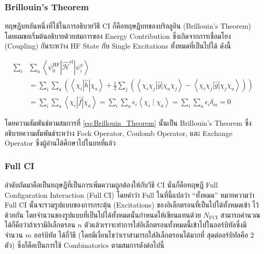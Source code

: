 \subsubsection{Brillouin's Theorem}

ทฤษฎีบทอันหนึ่งที่ใช้ในการอธิบายวิธี CI ก็คือทฤษฎีบทของบริลลูอิน (Brillouin's Theorem) โดยผมขอเริ่มต้นอธิบายด้วยสมการของ Energy
Contribution ซึ่งเกิดจากการเชื่อมโยง (Coupling) กันระหว่าง HF State กับ Single Excitations ทั้งหมดที่เป็นไปได้ ดังนี้

\begin{equation}
    \label{eq:Brillouin_Theorem}
    \begin{aligned}
        \sum_i & \sum_a
        \left\langle\psi_0^{\mathrm{HF}}
        \left| \hat{\mathscr{H}}^{\mathrm{el}} \right|
        \psi_i^a\right\rangle                                                         \\
               & = \sum_i \sum_a\left(\left\langle\chi_i|\hat{h}| \chi_a\right\rangle
        + \frac{1}{2} \sum_j\left(\left\langle\chi_i \chi_j|\hat{g}| \chi_a \chi_j\right\rangle
        - \left\langle\chi_i \chi_j|\hat{g}| \chi_j \chi_a\right\rangle\right)\right) \\
               & = \sum_i \sum_a\left\langle\chi_i|\hat{f}| \chi_a\right\rangle
        = \sum_i \sum_a \epsilon_i\left\langle\chi_i \mid \chi_a\right\rangle
        = \sum_i \sum_a \epsilon_i \delta_{i a}
        = 0
    \end{aligned}
\end{equation}

\noindent โดยความสัมพันธ์ตามสมการที่ \eqref{eq:Brillouin_Theorem} นั้นเป็น Brillouin's Theorem ซึ่งอธิบายความสัมพันธ์ระหว่าง
Fock Operator, Coulomb Operator, และ Exchange Operator ซึ่งผู้อ่านได้ศึกษาไปในบทที่แล้ว

\subsubsection{Full CI}

ลำดับถัดมาคือเป็นทฤษฎีที่เป็นการเพิ่มความถูกต้องให้กับวิธี CI นั่นก็คือทฤษฎี Full Configuration Interaction (Full CI) โดยคำว่า Full
ในที่นี้แปลว่า \enquote{ทั้งหมด} หมายความว่า Full CI นั้นจะรวมรูปแบบของการกระตุ้น (Excitations) ของอิเล็กตรอนที่เป็นไปได้ทั้งหมดเข้า%
ไว้ด้วยกัน โดยจำนวนของรูปแบบที่เป็นไปได้ทั้งหมดนั้นกำหนดให้เขียนแทนด้วย $N_{\mathrm{FCI}}$ สามารถคำนวณได้ก็คือว่าถ้าเรามีอิเล็กตรอน
$n$ ตัวแล้วเราจะทำการใส่อิเล็กตรอนทั้งหมดนี้เข้าไปในออร์บิทัลซึ่งมีจำนวน $m$ ออร์บิทัล ได้กี่วิธี (โดยมีเงื่อนไขว่าเราสามารถใส่อิเล็กตรอนได้มากที่%
สุดต่ออร์บิทัลคือ 2 ตัว) ซึ่งก็คือเป็นการใช้ Combinatorics ตามสมการดังต่อไปนี้

